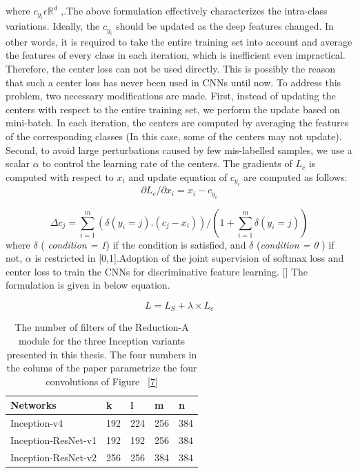 \documentclass[a4paper,12pt, twoside]{NITKReport}
\begin{document}
\par where $c_{y_{i}} \epsilon \mathbb{R}^{d}$ ,.The above formulation effectively characterizes the intra-class variations. Ideally, the $c_{y_{i}}$ should be updated as the deep features changed. In other words, it is required to take the entire training set into account and average the features of every class in each iteration, which is inefficient even impractical. Therefore, the center loss can not be used directly. This is possibly the reason that such a center loss has never been used in CNNs until now. To address this problem, two necessary modifications are made. First, instead of updating the centers with respect to the entire training set, we perform the update based on mini-batch. In each iteration, the centers are computed by averaging the features of the corresponding classes (In this case, some of the centers may not update). Second, to avoid large perturbations caused by few mis-labelled samples, we use a scalar $\alpha$ to control the learning rate of the centers. The gradients of $L_{c}$ is computed with respect to $x{_{i}}$ and update equation of $c_{y_{i}}$ are computed as follows:
\begin{equation}
\partial L_{c} / \partial x_{i} = x_{i} - c_{y_{i}}
\end{equation}

\begin{equation}
\Delta c_{j}=\sum_{i=1}^{m} (\delta (y_{i}=j).(c_{j}-x{_i}) ) / (1+\sum_{i=1}^{m} \delta(y_{i}=j))
\end{equation}
where $\delta$ (\textit{ condition = 1}) if the condition is satisfied, and $\delta$ (\textit{condition = 0 }) if not, $\alpha$ is restricted in [0,1].Adoption of the joint supervision of softmax loss and center loss to train the CNNs for discriminative feature learning. [\cite{wen2016discriminative}] The formulation is given in below equation.

\begin{equation}
L = L_{S} + \lambda \times L_{c} 
\end{equation}

\begin{table}
  \centering
\begin{tabular}{ |p{5cm}|p{2.5cm}|p{2.5cm}|p{2.5cm}|p{2.5cm}|}
 \hline
 Networks & k & l & m & n\\
 \hline
 Inception-v4 & 192 & 224 & 256 & 384\\
 \hline
 Inception-ResNet-v1 & 192 & 192 & 256 & 384\\
 \hline
 Inception-ResNet-v2 & 256 & 256 & 384 & 384\\
 \hline
\end{tabular}
\caption{The number of filters of the Reduction-A module for the
three Inception variants presented in this thesis. The four numbers
in the colums of the paper parametrize the four convolutions of
Figure ~\ref{7}}\label{table:number_of_filters}
\end{table}
\end{document}
